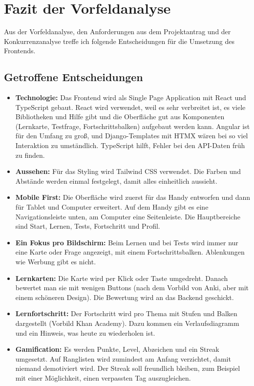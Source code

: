 \section{Fazit der Vorfeldanalyse}
\label{sec:fazit-frontend}
 
Aus der Vorfeldanalyse, den Anforderungen aus dem Projektantrag und der Konkurrenzanalyse treffe ich folgende Entscheidungen für die Umsetzung des Frontends.
 
\subsection{Getroffene Entscheidungen}
 
\begin{itemize}
    \item \textbf{Technologie:} Das Frontend wird als Single Page Application mit React und TypeScript gebaut. React wird verwendet, weil es sehr verbreitet ist, es viele Bibliotheken und Hilfe gibt und die Oberfläche gut aus Komponenten (Lernkarte, Testfrage, Fortschrittsbalken) aufgebaut werden kann. Angular ist für den Umfang zu groß, und Django-Templates mit HTMX wären bei so viel Interaktion zu umständlich. TypeScript hilft, Fehler bei den API-Daten früh zu finden.
    \item \textbf{Aussehen:} Für das Styling wird Tailwind CSS verwendet. Die Farben und Abstände werden einmal festgelegt, damit alles einheitlich aussieht.
    \item \textbf{Mobile First:} Die Oberfläche wird zuerst für das Handy entworfen und dann für Tablet und Computer erweitert. Auf dem Handy gibt es eine Navigationsleiste unten, am Computer eine Seitenleiste. Die Hauptbereiche sind Start, Lernen, Tests, Fortschritt und Profil.
    \item \textbf{Ein Fokus pro Bildschirm:} Beim Lernen und bei Tests wird immer nur eine Karte oder Frage angezeigt, mit einem Fortschrittsbalken. Ablenkungen wie Werbung gibt es nicht.
    \item \textbf{Lernkarten:} Die Karte wird per Klick oder Taste umgedreht. Danach bewertet man sie mit wenigen Buttons (nach dem Vorbild von Anki, aber mit einem schöneren Design). Die Bewertung wird an das Backend geschickt.
    \item \textbf{Lernfortschritt:} Der Fortschritt wird pro Thema mit Stufen und Balken dargestellt (Vorbild Khan Academy). Dazu kommen ein Verlaufsdiagramm und ein Hinweis, was heute zu wiederholen ist.
    \item \textbf{Gamification:} Es werden Punkte, Level, Abzeichen und ein Streak umgesetzt. Auf Ranglisten wird zumindest am Anfang verzichtet, damit niemand demotiviert wird. Der Streak soll freundlich bleiben, zum Beispiel mit einer Möglichkeit, einen verpassten Tag auszugleichen.

\end{itemize}
